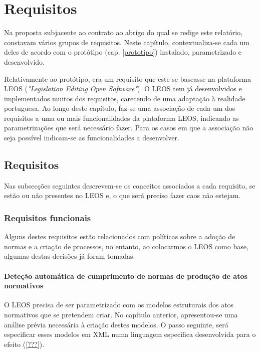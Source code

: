 \chapter{Requisitos}
\label{requisitos}

Na proposta subjacente ao contrato ao abrigo do qual se redige este relatório, constavam vários grupos de requisitos.
Neste capítulo, contextualiza-se cada um deles de acordo com o protótipo (cap. \ref{prototipo}) instalado, parametrizado 
e desenvolvido.

Relativamente ao protótipo, era um requisito que este se baseasse na plataforma LEOS (\emph{"Legislation Editing Open Software"}).
O LEOS tem já desenvolvidos e implementados muitos dos requisitos, carecendo de uma adaptação à realidade portuguesa.
Ao longo deste capítulo, faz-se uma associação de cada um dos requisitos a uma ou mais funcionalidades da plataforma LEOS,
indicando as parametrizações que será necessário fazer. Para os casos em que a associação não seja possível indicam-se as 
funcionalidades a desenvolver.

\section{Requisitos}

Nas subsecções seguintes descrevem-se os conceitos associados a cada requisito, se estão ou não presentes no LEOS e,
o que será preciso fazer caos não estejam.

\subsection{Requisitos funcionais}

Alguns destes requisitos estão relacionados com políticas sobre a adoção de normas e a criação de processos, no entanto,
ao colocarmos o LEOS como base, algumas destas decisões já foram tomadas.

\subsubsection{Deteção automática de cumprimento de normas de produção de atos normativos}

O LEOS precisa de ser parametrizado com os modelos estruturais dos atos normativos que se pretendem criar.
No capítulo anterior, apresentou-se uma análise prévia necessária à criação destes modelos. O passo seguinte, será 
especificar esses modelos em XML numa linguagem específica desenvolvida para o efeito (\ref{???}).

